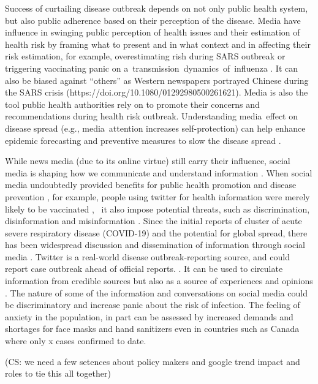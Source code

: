 Success of curtailing disease outbreak depends on not only public health system, but also public adherence based on their perception of the disease.  Media have influence in swinging public perception of health issues and their estimation of health risk by framing what to present and in what context and in affecting their risk estimation, for example, overestimating rish during SARS outbreak \citep{BerrWalf07} or triggering vaccinating panic on a transmission dynamics of influenza \citep{TuchDube11}.  It can also be biased against “others” as Western newspapers portrayed Chinese during the SARS crisis \citep{HuanLeun06} (https://doi.org/10.1080/01292980500261621).  Media is also the tool public health authorities rely on to promote their concerns and recommendations during health risk outbreak.  Understanding media effect on disease spread (e.g., media attention increases self-protection) can help enhance epidemic forecasting and preventive measures to slow the disease spread \citep{KimFast19}.  

While news media (due to its online virtue) still carry their influence, social media is shaping how we communicate and understand information \citep{LiuSieg19}.  When social media undoubtedly provided benefits for public health promotion and disease prevention \cite{BascHill20, SunYang20}, for example, people using twitter for health information were merely likely to be vaccinated \citep{AhmeQuin18},  it also impose potential threats, such as discrimination, disinformation and misinformation \citep{ChouOa18, McKevanS19}.  Since the initial reports of cluster of acute severe respiratory disease (COVID-19) and the potential for global spread, there has been widespread discussion and dissemination of information through social media \citep{?}.  Twitter is a real-world disease outbreak-reporting source, and could report case outbreak ahead of official reports. \citep{YoutDara19}.  It can be used to circulate information from credible sources but also as a source of experiences and opinions \citep{ChewEyes10}.  The nature of some of the information and conversations on social media could be discriminatory and increase panic about the risk of infection. The feeling of anxiety in the population, in part can be assessed by increased demands and shortages for face masks and hand sanitizers even in countries such as Canada where only x cases confirmed to date. 

(CS:  we need a few setences about policy makers and google trend impact and roles to tie this all together)

